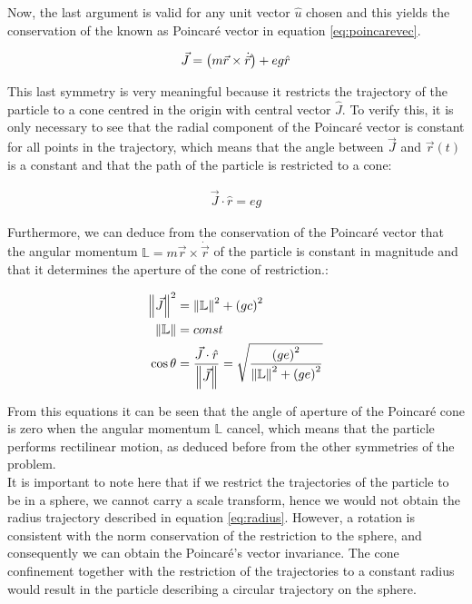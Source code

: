 Now, the last argument is valid for any unit vector $\hat{u}$ chosen and this yields the conservation of the  known as Poincar\'e vector in equation \eqref{eq:poincarevec}.

\begin{equation}
\vec{J} = \left( m\vec{r}\times\dot{\vec{r}} \right)+ eg\hat{r}
\label{eq:poincarevec}
\end{equation}

This last symmetry is very meaningful because it restricts the trajectory of the particle to a cone centred in the origin with central vector $\hat{J}$. To verify this, it is only necessary to see that the radial component of the Poincar\'e vector is constant for all points in the trajectory, which means that the angle between $\vec{J}$ and $\vec{r}(t)$ is a constant and that the path of the particle is restricted to a cone:

\begin{align*}
\vec{J}\cdot\hat{r} = eg
\end{align*}

Furthermore, we can deduce from the conservation of the Poincar\'e vector that the angular momentum $\mathbb{L}= m\vec{r}\times\dot{\vec{r}}$ of the particle is constant in magnitude and that it determines the aperture of the cone of restriction.:

\begin{equation}
\begin{aligned}
\left\lVert \vec{J} \right\rVert^2 &= \left\lVert \mathbb{L} \right\rVert^2 +\left( gc \right)^2\\
\left\lVert \mathbb{L} \right\rVert &= const\\
\cos{\theta} &= \frac{\vec{J}\cdot\hat{r}}{\left\lVert \vec{J} \right\rVert} = \sqrt{\frac{\left( ge \right)^2}{\left\lVert \mathbb{L} \right\rVert^2 +\left( ge \right)^2}}
\end{aligned}
\label{eq:poincarecone}
\end{equation}


From this equations it can be seen that the angle of aperture of the Poincar\'e cone is zero when the angular momentum $\mathbb{L}$ cancel, which means that the particle performs rectilinear motion, as deduced before from the other symmetries of the problem.\\

It is important to note here that if we restrict the trajectories of the particle to be in a sphere, we cannot carry a scale transform, hence we would not obtain the radius trajectory described in equation \eqref{eq:radius}. However, a rotation is consistent with the norm conservation of the restriction to the sphere, and consequently we can obtain the Poincar\'e's vector invariance. The cone confinement together with the restriction of the trajectories to a constant radius would result in the particle describing a circular trajectory on the sphere.\\ 

